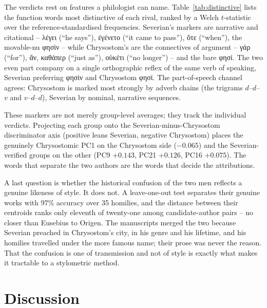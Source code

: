 \documentclass{anthology-ch}
\newcommand{\gk}[1]{{\greekfont #1}}
\newcommand{\gk}[1]{#1}
\begin{document}
The verdicts rest on features a philologist can name. Table~\ref{tab:distinctive} lists the function words most distinctive of each rival, ranked by a Welch $t$-statistic over the reference-standardised frequencies. Severian's markers are narrative and citational -- \gk{λέγει} (``he says''), \gk{ἐγένετο} (``it came to pass''), \gk{ὅτε} (``when''), the movable-nu \gk{φησὶν} -- while Chrysostom's are the connectives of argument -- \gk{γάρ} (``for''), \gk{ἂν}, \gk{καθάπερ} (``just as''), \gk{οὐκέτι} (``no longer'') -- and the bare \gk{φησί}. The two even part company on a single orthographic reflex of the same verb of speaking, Severian preferring \gk{φησὶν} and Chrysostom \gk{φησί}. The part-of-speech channel agrees: Chrysostom is marked most strongly by adverb chains (the trigrams $d$--$d$--$v$ and $v$--$d$--$d$), Severian by nominal, narrative sequences.

These markers are not merely group-level averages; they track the individual verdicts. Projecting each group onto the Severian-minus-Chrysostom discriminator axis (positive leans Severian, negative Chrysostom) places the genuinely Chrysostomic PC1 on the Chrysostom side ($-0.065$) and the Severian-verified groups on the other (PC9 $+0.143$, PC21 $+0.126$, PC16 $+0.075$). The words that separate the two authors are the words that decide the attributions.

A last question is whether the historical confusion of the two men reflects a genuine likeness of style. It does not. A leave-one-out test separates their genuine works with $97\%$ accuracy over 35 homilies, and the distance between their centroids ranks only eleventh of twenty-one among candidate-author pairs -- no closer than Eusebius to Origen. The manuscripts merged the two because Severian preached in Chrysostom's city, in his genre and his lifetime, and his homilies travelled under the more famous name; their prose was never the reason. That the confusion is one of transmission and not of style is exactly what makes it tractable to a stylometric method.

\begin{table}[t]
  \centering
  \small
  
  \caption{Function words most distinctive of each rival, ranked by a Welch $t$-statistic over reference-standardised frequencies. Severian favours narrative and citational words; Chrysostom favours the connectives of argument.}
  \label{tab:distinctive}
\end{table}

\section{Discussion}
\end{document}
